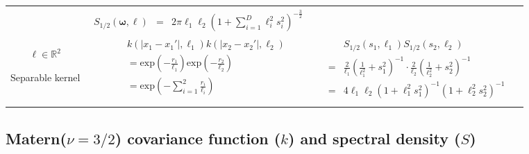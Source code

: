 \documentclass[]{interact}
\theoremstyle{plain}%
\theoremstyle{definition}
\theoremstyle{remark}
\begin{document}
\begin{landscape}
\begin{table}[H]
\begin{center}
\begin{tabular}{|c|c|c|c|}
       & \multicolumn{1}{|p{9.7cm}|}{\small
         \begin{eqnarray*}
		S_{1/2}(\bm{\omega},\bm{\ell}) &=& 2\pi\ell_1\ell_2 \left(1+\sum_{i=1}^{D}\ell_i^2s_{i}^2\right)^{-\frac{3}{2}}
         \end{eqnarray*}
       }
       
       & \multicolumn{1}{|p{5.7cm}|}{\small

       } \\  
       
       \cline{1-3}
       
       \multicolumn{1}{|p{1.5cm}|}{
       \vspace{1mm}
       $\bm{\ell} \in \mathbb{R}^2$
       
       {Separable kernel} 
       }
       
        & \multicolumn{1}{|p{5.7cm}|}{\small
         \begin{eqnarray*}
		&&k(|x_1-x_1'|,\ell_1)k(|x_2-x_2'|,\ell_2) \\
		&&= \mathrm{exp}\left(- \frac{r_1}{\ell_1} \right) \mathrm{exp}\left(- \frac{r_2}{\ell_2} \right) \\
		&&= \mathrm{exp}\left(- \sum_{i=1}^{2}\frac{r_i}{\ell_i} \right)
         \end{eqnarray*}
       }
       
       & \multicolumn{1}{|p{9.7cm}|}{\small
         \begin{eqnarray*}
         &&S_{1/2}(s_1,\ell_1)S_{1/2}(s_2,\ell_2) \\
		&=& \frac{2}{\ell_1}\left(\frac{1}{\ell_1^2}+s_1^2 \right)^{-1} \cdot \frac{2}{\ell_2}\left(\frac{1}{\ell_2^2}+s_2^2 \right)^{-1} \\
		&=& 4\ell_1\ell_2\left(1+\ell_1^2s_1^2 \right)^{-1} \left(1+\ell_2^2s_2^2 \right)^{-1} \\
         \end{eqnarray*}      
       } 

       & \multicolumn{1}{|p{6.7cm}|}{\small

       } \\ 
       
       \hline
    \end{tabular}
  \end{center}
\end{table}


\newpage	
\subsection{Matern($\nu=3/2$) covariance function ($k$) \textbf and spectral density ($S$)}
\vspace{-2mm}

\end{landscape}
\end{document}
